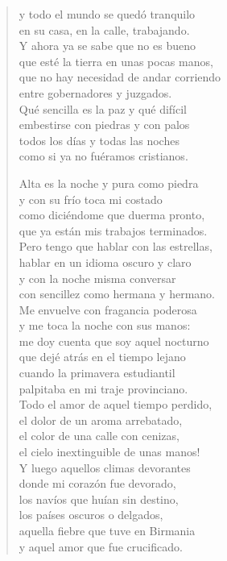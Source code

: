 \documentclass[12pt]{article}
\begin{document}
\begin{verse}
y todo el mundo se quedó tranquilo\\
en su casa, en la calle, trabajando.\\
Y ahora ya se sabe que no es bueno\\
que esté la tierra en unas pocas manos,\\
que no hay necesidad de andar corriendo\\
entre gobernadores y juzgados.\\
Qué sencilla es la paz y qué difícil\\
embestirse con piedras y con palos\\
todos los días y todas las noches\\
como si ya no fuéramos cristianos.  

Alta es la noche y pura como piedra\\
y con su frío toca mi costado\\
como diciéndome que duerma pronto,\\
que ya están mis trabajos terminados.\\
Pero tengo que hablar con las estrellas,\\
hablar en un idioma oscuro y claro\\
y con la noche misma conversar\\
con sencillez como hermana y hermano.\\
Me envuelve con fragancia poderosa\\
y me toca la noche con sus manos:\\
me doy cuenta que soy aquel nocturno\\
que dejé atrás en el tiempo lejano\\
cuando la primavera estudiantil\\
palpitaba en mi traje provinciano.\\
Todo el amor de aquel tiempo perdido,\\
el dolor de un aroma arrebatado,\\
el color de una calle con cenizas,\\
el cielo inextinguible de unas manos!\\
Y luego aquellos climas devorantes\\
donde mi corazón fue devorado,\\
los navíos que huían sin destino,\\
los países oscuros o delgados,\\
aquella fiebre que tuve en Birmania\\
y aquel amor que fue crucificado.  


\end{verse}
\end{document}
